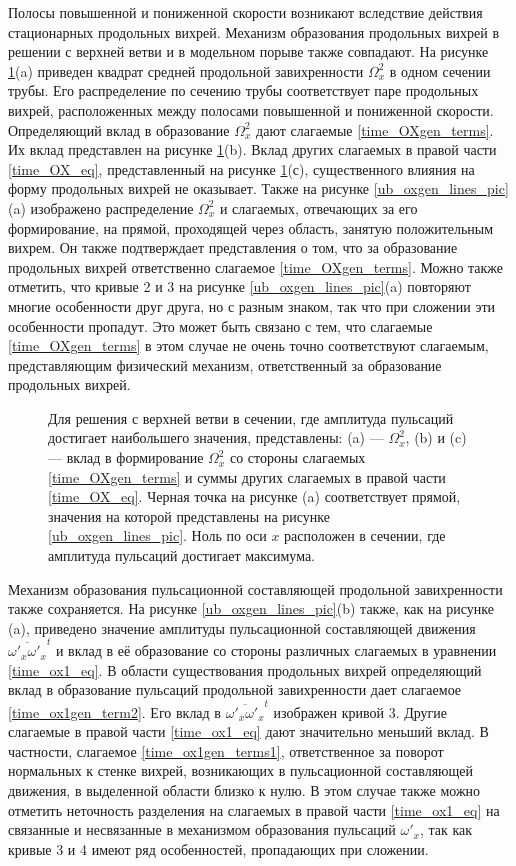 Полосы повышенной и пониженной скорости возникают вследствие действия стационарных продольных вихрей. 
Механизм образования продольных вихрей в решении с верхней ветви и в модельном порыве также совпадают. На рисунке \ref{ub_OXgen_pic}(a) приведен квадрат средней продольной завихренности $\Omega_x^2$ в одном сечении трубы. Его распределение по сечению трубы соответствует паре продольных вихрей, расположенных между полосами повышенной и пониженной скорости. Определяющий вклад в образование $\Omega_x^2$ дают слагаемые \eqref{time_OXgen_terms}. Их вклад представлен на рисунке \ref{ub_OXgen_pic}(b). Вклад других слагаемых в правой части \eqref{time_OX_eq}, представленный на рисунке \ref{ub_OXgen_pic}(с), существенного влияния на форму продольных вихрей не оказывает. Также на рисунке \ref{ub_oxgen_lines_pic}(a) изображено распределение $\Omega_x^2$ и слагаемых, отвечающих за его формирование, на прямой, проходящей через область, занятую положительным вихрем. Он также подтверждает представления о том, что за образование продольных вихрей ответственно слагаемое \eqref{time_OXgen_terms}. Можно также отметить, что кривые 2 и 3 на рисунке \ref{ub_oxgen_lines_pic}(a) повторяют многие особенности друг друга, но с разным знаком, так что при сложении эти особенности пропадут. Это может быть связано с тем, что слагаемые \eqref{time_OXgen_terms} в этом случае не очень точно соответствуют слагаемым, представляющим физический механизм, ответственный за образование продольных вихрей. 
 

\begin{figure}
\caption{Для решения с верхней ветви в сечении, где амплитуда пульсаций достигает наибольшего значения, представлены: (a) --- $\Omega_x^2$, (b) и (c) --- вклад в формирование $\Omega_x^2$ со стороны слагаемых \eqref{time_OXgen_terms} и суммы других слагаемых в правой части \eqref{time_OX_eq}. Черная точка на рисунке (a) соответствует прямой, значения на которой представлены на рисунке \ref{ub_oxgen_lines_pic}. Ноль по оси $x$ расположен в сечении, где амплитуда пульсаций достигает максимума.}
\label{ub_OXgen_pic}
\end{figure}

Механизм образования пульсационной составляющей продольной завихренности также сохраняется. На рисунке \ref{ub_oxgen_lines_pic}(b) также, как на рисунке (a), приведено значение амплитуды пульсационной составляющей движения $\overline{\omega'_x\omega'_x}^t$ и вклад в её образование со стороны различных слагаемых в уравнении \eqref{time_ox1_eq}. В области существования продольных вихрей определяющий вклад в образование пульсаций продольной завихренности дает слагаемое \eqref{time_ox1gen_term2}. Его вклад в $\overline{\omega'_x\omega'_x}^t$ изображен кривой 3. Другие слагаемые в правой части \eqref{time_ox1_eq} дают значительно меньший вклад. В частности, слагаемое \eqref{time_ox1gen_terms1}, ответственное за поворот нормальных к стенке вихрей, возникающих в пульсационной составляющей движения, в выделенной области близко к нулю. В этом случае также можно отметить неточность разделения на слагаемых в правой части \eqref{time_ox1_eq} на связанные и несвязанные в механизмом образования пульсаций $\omega'_x$, так как кривые 3 и 4 имеют ряд особенностей, пропадающих при сложении.

